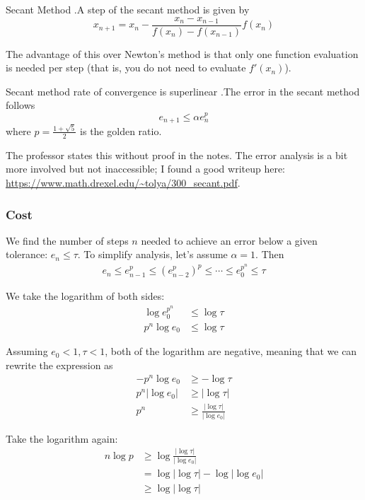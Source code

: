\documentclass[12pt,letterpaper]{article}
\begin{document}
\begin{algo}{Secant Method}
.A step of the secant method is given by
\begin{equation}
	x_{n+1} = x_n - \frac{x_n - x_{n-1}}{f(x_n) - f(x_{n-1})} f(x_n)
\end{equation}

The advantage of this over Newton's method is that only one function evaluation is needed per step (that is, you do not need to evaluate $f'(x_n)$).
\end{algo}

\begin{theo}{Secant method rate of convergence is superlinear}
.The error in the secant method follows
\begin{equation}
	e_{n+1} \leq \alpha e_n^p
\end{equation}
where $p = \frac{1 + \sqrt{5}}{2}$ is the golden ratio.
\end{theo}

The professor states this without proof in the notes. The error analysis is a bit more involved but not inaccessible; I found a good writeup here: \url{https://www.math.drexel.edu/~tolya/300_secant.pdf}.

\subsubsection{Cost}
We find the number of steps $n$ needed to achieve an error below a given tolerance: $e_n \leq \tau$. To simplify analysis, let's assume $\alpha = 1$. Then
\begin{align}
	e_n \leq e_{n-1}^p \leq (e_{n-2}^p)^p \leq \cdots \leq e_0^{p^n} \leq \tau
\end{align}

We take the logarithm of both sides:
\begin{align}
	\log e_0^{p^n} &\leq \log \tau \\
	p^n \log e_0 &\leq \log \tau
\end{align}

Assuming $e_0 < 1, \tau < 1$, both of the logarithm are negative, meaning that we can rewrite the expression as
\begin{align}
	- p^n \log e_0 &\geq -\log \tau \\
	p^n \lvert \log e_0 \rvert &\geq \lvert \log \tau \rvert \\
	p^n &\geq \frac{\lvert \log \tau \rvert}{\lvert \log e_0 \rvert}
\end{align}

Take the logarithm again:
\begin{align}
	n \log p &\geq \log \frac{\lvert \log \tau \rvert}{\lvert \log e_0 \rvert} \\
	&= \log \lvert \log \tau \rvert - \log \lvert \log e_0 \rvert \\
	&\geq \log \lvert \log \tau \rvert
\end{align}
\end{document}
